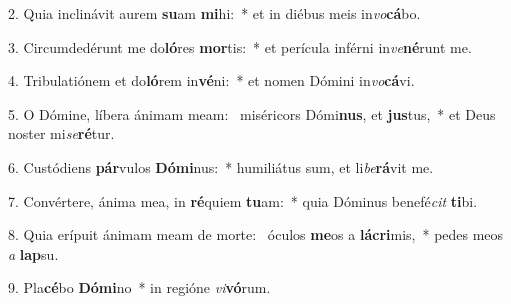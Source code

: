 2. Quia inclinávit aurem \textbf{su}am \textbf{mi}hi:~*  et in diébus meis in\textit{vo}\textbf{cá}bo.\

3. Circumdedérunt me do\textbf{ló}res \textbf{mor}tis:~*  et perícula inférni in\textit{ve}\textbf{né}runt me.\

4. Tribulatiónem et do\textbf{ló}rem in\textbf{vé}ni:~*  et nomen Dómini in\textit{vo}\textbf{cá}vi.\

5. O Dómine, líbera ánimam meam: \dag\  miséricors Dómi\textbf{nus}, et \textbf{jus}tus,~*  et Deus noster mi\textit{se}\textbf{ré}tur.\

6. Custódiens \textbf{pár}vulos \textbf{Dó}\textbf{mi}nus:~*  humiliátus sum, et li\textit{be}\textbf{rá}vit me.\

7. Convértere, ánima mea, in \textbf{ré}quiem \textbf{tu}am:~*  quia Dóminus benefé\textit{cit} \textbf{ti}bi.\

8. Quia erípuit ánimam meam de morte: \dag\  óculos \textbf{me}os a \textbf{lá}\textbf{cri}mis,~*  pedes meos \textit{a} \textbf{lap}su.\

9. Pla\textbf{cé}bo \textbf{Dó}\textbf{mi}no~*  in regióne \textit{vi}\textbf{vó}rum.\

